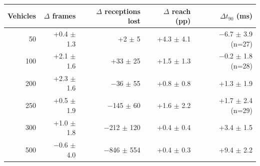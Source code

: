 \footnotesize
\renewcommand{\arraystretch}{1.2}
\begin{tabular}{rrrrr}
\toprule
Vehicles & $\Delta$ frames & $\Delta$ receptions lost & $\Delta$ reach (pp) & $\Delta t_{90}$ (ms) \\
\midrule
50 & +0.4 $\pm$ 1.3 & +2 $\pm$ 5 & +4.3 $\pm$ 4.1 & $-$6.7 $\pm$ 3.9 (n=27) \\
100 & +2.1 $\pm$ 1.6 & +33 $\pm$ 25 & +1.5 $\pm$ 1.3 & $-$0.2 $\pm$ 1.8 (n=28) \\
200 & +2.3 $\pm$ 1.6 & $-$36 $\pm$ 55 & +0.8 $\pm$ 0.8 & +1.3 $\pm$ 1.9 \\
250 & +0.5 $\pm$ 1.9 & $-$145 $\pm$ 60 & +1.6 $\pm$ 2.2 & +1.7 $\pm$ 2.4 (n=29) \\
300 & +1.0 $\pm$ 1.8 & $-$212 $\pm$ 120 & +0.4 $\pm$ 0.4 & +3.4 $\pm$ 1.5 \\
500 & $-$0.6 $\pm$ 4.0 & $-$846 $\pm$ 554 & +0.4 $\pm$ 0.3 & +9.4 $\pm$ 2.2 \\
\bottomrule
\end{tabular}
